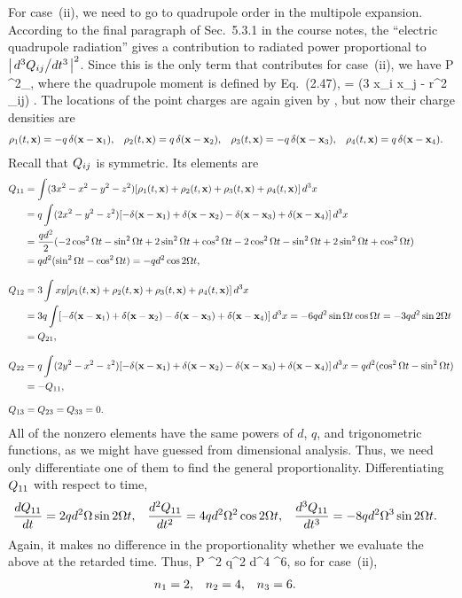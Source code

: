 \begin{solution}
	For case~(ii), we need to go to quadrupole order in the multipole expansion.  According to the final paragraph of Sec.~5.3.1 in the course notes, the ``electric quadrupole radiation'' gives a contribution to radiated power proportional to $\abs{\dv*[3]{Q_{ij}}{t}}^2$.  Since this is the only term that contributes for case~(ii), we have
	\beq
		P \propto {}^2_\ret,
	\eeq
	where the quadrupole moment is defined by Eq.~(2.47),
	\beq
		\Qij = \int (3 x_i x_j - r^2 \del_{ij}) \rho \dcx.
	\eeq
	The locations of the point charges are again given by , but now their charge densities are
	\begin{align*}
		\rho_1(t, \vb{x}) &= -q \, \delta(\vb{x} - \vb{x}_1), &
		\rho_2(t, \vb{x}) &= q \, \delta(\vb{x} - \vb{x}_2), &
		\rho_3(t, \vb{x}) &= -q \, \delta(\vb{x} - \vb{x}_3), &
		\rho_4(t, \vb{x}) &= q \, \delta(\vb{x} - \vb{x}_4).
	\end{align*}
	Recall that $Q_{ij}$ is symmetric.  Its elements are
	\begin{align*}
		Q_{11} &= \int (3 x^2 - x^2 - y^2 - z^2) [ \rho_1(t, \vb{x}) + \rho_2(t, \vb{x}) + \rho_3(t, \vb{x}) + \rho_4(t, \vb{x}) ] \dd[3]{x} \\
		&= q \int (2 x^2 - y^2 - z^2) [ -\delta(\vb{x} - \vb{x}_1) + \delta(\vb{x} - \vb{x}_2) - \delta(\vb{x} - \vb{x}_3) + \delta(\vb{x} - \vb{x}_4) ] \dd[3]{x} \\
		&= \frac{q d^2}{2} (-2 \cos^2 \Omega t - \sin^2 \Omega t + 2 \sin^2 \Omega t + \cos^2 \Omega t - 2 \cos^2 \Omega t - \sin^2 \Omega t + 2 \sin^2 \Omega t + \cos^2 \Omega t) \\
		&= q d^2 (\sin^2 \Omega t - \cos^2 \Omega t)
		= -q d^2 \cos 2\Omega t, \\[2ex]
		Q_{12} & = 3 \int xy [ \rho_1(t, \vb{x}) + \rho_2(t, \vb{x}) + \rho_3(t, \vb{x}) + \rho_4(t, \vb{x}) ] \dd[3]{x} \\
		&= 3q \int [ -\delta(\vb{x} - \vb{x}_1) + \delta(\vb{x} - \vb{x}_2) - \delta(\vb{x} - \vb{x}_3) + \delta(\vb{x} - \vb{x}_4) ] \dd[3]{x}
		= -6 q d^2 \sin \Omega t \cos \Omega t
		= -3 q d^2 \sin 2\Omega t \\
		&= Q_{21}, \\[2ex]
		Q_{22} &= q \int (2 y^2 - x^2 - z^2) [ -\delta(\vb{x} - \vb{x}_1) + \delta(\vb{x} - \vb{x}_2) - \delta(\vb{x} - \vb{x}_3) + \delta(\vb{x} - \vb{x}_4) ] \dd[3]{x}
		= q d^2 (\cos^2 \Omega t - \sin^2 \Omega t) \\
		&= -Q_{11}, \\[2ex]
		Q_{13} &= Q_{23} = Q_{33} = 0.
	\end{align*}
	All of the nonzero elements have the same powers of $d$, $q$, and trigonometric functions, as we might have guessed from dimensional analysis.  Thus, we need only differentiate one of them to find the general proportionality.  Differentiating $Q_{11}$ with respect to time,
	\begin{align*}
		\dv{Q_{11}}{t} &= 2 q d^2 \Omega \sin 2\Omega t, &
		\dv[2]{Q_{11}}{t} &= 4 q d^2 \Omega^2 \cos 2\Omega t, &
		\dv[3]{Q_{11}}{t} &= -8 q d^2 \Omega^3 \sin 2\Omega t.
	\end{align*}
	Again, it makes no difference in the proportionality whether we evaluate the above at the retarded time.  Thus,
	\beq
		P \propto {}^2
		\propto q^2 d^4 \Omg^6,
	\eeq
	so for case~(ii),
	\begin{align*}
		{n_1} &= 2, &
		{n_2} &= 4, &
		{n_3} &= 6.
	\end{align*}
	\vfix
\end{solution}